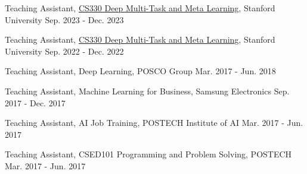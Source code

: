 \vspace{5pt}

\begin{cvhonors}
  \cvitem
    {Teaching Assistant, \href{https://cs330.stanford.edu/}{CS330 Deep Multi-Task and Meta Learning}, Stanford University} %
    {Sep. 2023 - Dec. 2023} %

  \cvitem
    {Teaching Assistant, \href{https://cs330.stanford.edu/}{CS330 Deep Multi-Task and Meta Learning}, Stanford University} %
    {Sep. 2022 - Dec. 2022} %

  \cvitem
    {Teaching Assistant, Deep Learning, POSCO Group} %
    {Mar. 2017 - Jun. 2018} %

  \cvitem
    {Teaching Assistant, Machine Learning for Business, Samsung Electronics}%
    {Sep. 2017 - Dec. 2017} %

  \cvitem
    {Teaching Assistant, AI Job Training, POSTECH Institute of AI} %
    {Mar. 2017 - Jun. 2017} %

  \cvitem
    {Teaching Assistant, CSED101 Programming and Problem Solving, POSTECH} %
    {Mar. 2017 - Jun. 2017} %

\end{cvhonors}